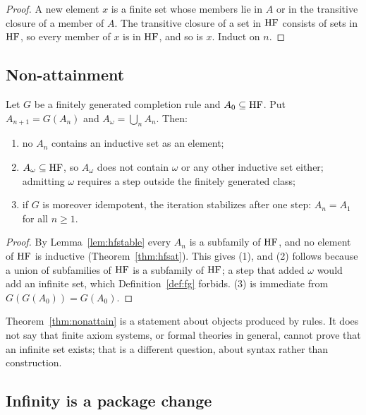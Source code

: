 \begin{proof}
A new element $x$ is a finite set whose members lie in $A$ or in the transitive closure of a
member of $A$. The transitive closure of a set in $\mathrm{HF}$ consists of sets in $\mathrm{HF}$, so every member
of $x$ is in $\mathrm{HF}$, and so is $x$. Induct on $n$.
\end{proof}

\subsection{Non-attainment}

\begin{theorem}\label{thm:nonattain}
Let $G$ be a finitely generated completion rule and $A_0\subseteq\mathrm{HF}$. Put $A_{n+1}=G(A_n)$ and
$A_\omega=\bigcup_n A_n$. Then:
\begin{enumerate}\itemsep0pt
  \item no $A_n$ contains an inductive set as an element;
  \item $A_\omega\subseteq\mathrm{HF}$, so $A_\omega$ does not contain $\omega$ or any other inductive
  set either; admitting $\omega$ requires a step outside the finitely generated class;
  \item if $G$ is moreover idempotent, the iteration stabilizes after one step:
  $A_n=A_1$ for all $n\ge1$.
\end{enumerate}
\end{theorem}

\begin{proof}
By Lemma~\ref{lem:hfstable} every $A_n$ is a subfamily of $\mathrm{HF}$, and no element of $\mathrm{HF}$ is
inductive (Theorem~\ref{thm:hfsat}). This gives (1), and (2) follows because a union of
subfamilies of $\mathrm{HF}$ is a subfamily of $\mathrm{HF}$; a step that added $\omega$ would add an infinite
set, which Definition~\ref{def:fg} forbids. (3) is immediate from $G(G(A_0))=G(A_0)$.
\end{proof}

Theorem~\ref{thm:nonattain} is a statement about objects produced by rules. It does not say that
finite axiom systems, or formal theories in general, cannot prove that an infinite set exists;
that is a different question, about syntax rather than construction.

\subsection{Infinity is a package change}

